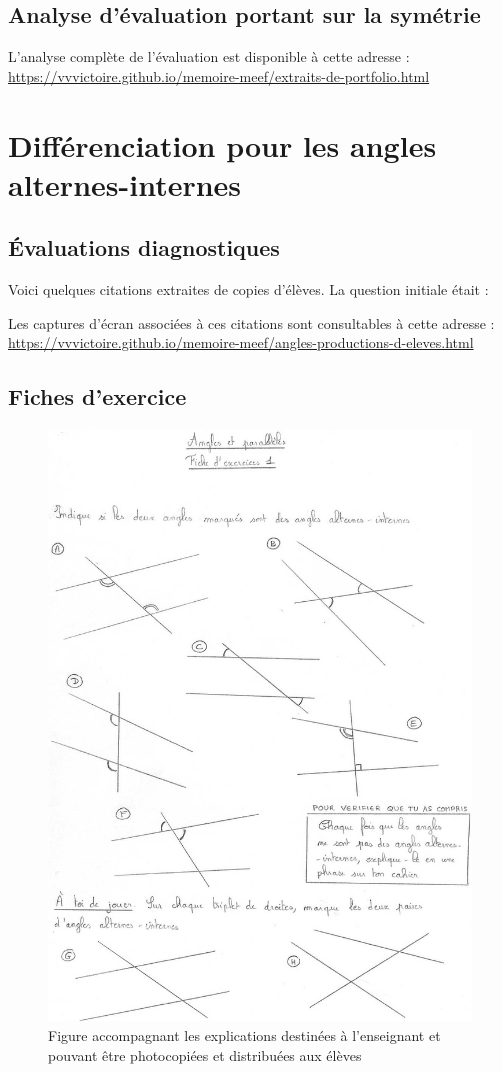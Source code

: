 \subsection{Analyse d'évaluation portant sur la symétrie}\label{annexe:symetrie-eval}

L'analyse complète de l'évaluation est disponible à cette adresse : \url{https://vvvictoire.github.io/memoire-meef/extraits-de-portfolio.html}

\clearpage

\section{Différenciation pour les angles alternes-internes}

\subsection{Évaluations diagnostiques}\label{annexe:angles-prod1}

Voici quelques citations extraites de copies d'élèves. La question initiale était : 

Les captures d'écran associées à ces citations sont consultables à cette adresse : \url{https://vvvictoire.github.io/memoire-meef/angles-productions-d-eleves.html}

\subsection{Fiches d'exercice}\label{annexe:angles-fiches}

\begin{figure}[h!]
    \centering
    \includegraphics[width=0.6\linewidth]{img/anglesfiche1.jpg}
    \caption{Figure accompagnant les explications destinées à l'enseignant et pouvant être photocopiées et distribuées aux élèves}
    \label{fig:angles-fiche1}
\end{figure}

